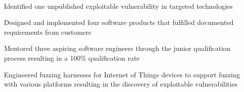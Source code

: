 \documentclass[]{resume}
\begin{document}
\begin{minipage}[t]{0.69\textwidth}
 \\
\begin{tightemize}
\item Identified one unpublished exploitable vulnerability in targeted technologies
\item Designed and implemented four software products that fulfilled documented requirements from customers
\item Mentored three aspiring software engineers through the junior qualification process resulting in a 100\% qualification rate
\item Engineered fuzzing harnesses for Internet of Things devices to support fuzzing with various platforms resulting in the discovery of exploitable vulnerabilities
\end{tightemize}

\sectionsep


\end{minipage}
\end{document}
